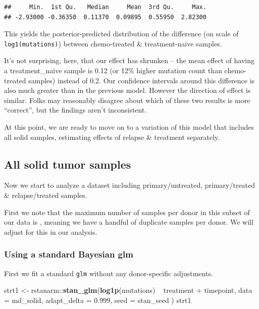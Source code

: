 \documentclass[]{article}
\newenvironment{Shaded}{\begin{snugshade}}{\end{snugshade}}
\newcommand{\KeywordTok}[1]{\textcolor[rgb]{0.13,0.29,0.53}{\textbf{{#1}}}}
\newcommand{\DataTypeTok}[1]{\textcolor[rgb]{0.13,0.29,0.53}{{#1}}}
\newcommand{\FloatTok}[1]{\textcolor[rgb]{0.00,0.00,0.81}{{#1}}}
\newcommand{\StringTok}[1]{\textcolor[rgb]{0.31,0.60,0.02}{{#1}}}
\newcommand{\NormalTok}[1]{{#1}}
\begin{document}
\begin{verbatim}
##     Min.  1st Qu.   Median     Mean  3rd Qu.     Max. 
## -2.93000 -0.36350  0.11370  0.09895  0.55950  2.82300
\end{verbatim}

This yields the posterior-predicted distribution of the difference (on
scale of \texttt{log1(mutations)}) between chemo-treated \&
treatment-naive samples.

It's not surprising, here, that our effect has shrunken -- the mean
effect of having a treatment\_naive sample is 0.12 (or 12\% higher
mutation count than chemo-treated samples) instead of 0.2. Our
confidence intervals around this difference is also much greater than in
the previous model. However the direction of effect is similar. Folks
may reasonably disagree about which of these two results is more
``correct'', but the findings aren't inconsistent.

At this point, we are ready to move on to a variation of this model that
includes all solid samples, estimating effects of relapse \& treatment
separately.

\subsection{All solid tumor samples}\label{all-solid-tumor-samples}

Now we start to analyze a dataset including primary/untreated,
primary/treated \& relapse/treated samples.

First we note that the maximum number of samples per donor in this
subset of our data is , meaning we have a handful of duplicate samples
per donor. We will adjust for this in our analysis.

\subsubsection{Using a standard Bayesian
glm}\label{using-a-standard-bayesian-glm}

First we fit a standard \texttt{glm} without any donor-specific
adjustments.

\begin{Shaded}
\begin{Highlighting}[]
\NormalTok{strt1 <-}\StringTok{ }\NormalTok{rstanarm::}\KeywordTok{stan_glm}\NormalTok{(}\KeywordTok{log1p}\NormalTok{(mutations) ~}\StringTok{ }\NormalTok{treatment +}\StringTok{ }\NormalTok{timepoint,}
                           \DataTypeTok{data =} \NormalTok{md_solid, }
                           \DataTypeTok{adapt_delta =} \FloatTok{0.999}\NormalTok{,}
                           \DataTypeTok{seed =} \NormalTok{stan_seed}
                           \NormalTok{)}
\NormalTok{strt1}
\end{Highlighting}
\end{Shaded}
\end{document}
